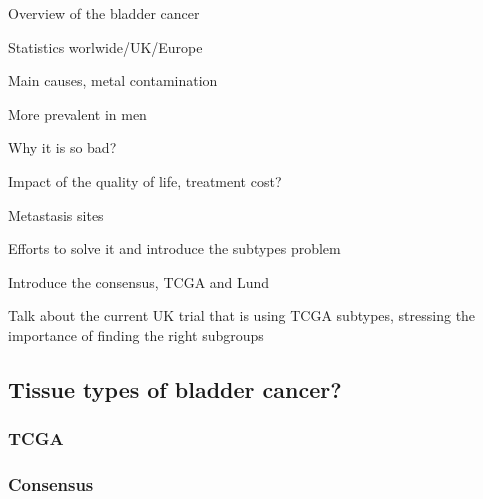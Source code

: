 
\begin{todolist}
    \item Overview of the bladder cancer 
    \begin{todolist}
        \item [\done] Statistics worlwide/UK/Europe
        \item Main causes, metal contamination
        \item More prevalent in men
    \end{todolist}
    \item Why it is so bad? 
    \begin{todolist}
        \item [\done] Impact of the quality of life, treatment cost?
        \item Metastasis sites
    \end{todolist}
    \item Efforts to solve it and introduce the subtypes problem
    \item Introduce the consensus, TCGA and Lund
    \item Talk about the current UK trial that is using TCGA subtypes, stressing the importance of finding the right subgroups

\end{todolist}

\subsection{Tissue types of bladder cancer?}

\subsubsection{TCGA}








\subsubsection{Consensus}

